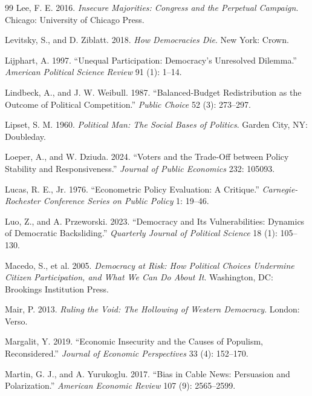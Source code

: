 \documentclass[12pt,letterpaper]{article}
\begin{document}
\begin{thebibliography}{99}
Lee, F. E. 2016. \textit{Insecure Majorities: Congress and the Perpetual Campaign}. Chicago: University of Chicago Press.

Levitsky, S., and D. Ziblatt. 2018. \textit{How Democracies Die}. New York: Crown.

Lijphart, A. 1997. ``Unequal Participation: Democracy's Unresolved Dilemma.'' \textit{American Political Science Review} 91 (1): 1--14.

Lindbeck, A., and J. W. Weibull. 1987. ``Balanced-Budget Redistribution as the Outcome of Political Competition.'' \textit{Public Choice} 52 (3): 273--297.

Lipset, S. M. 1960. \textit{Political Man: The Social Bases of Politics}. Garden City, NY: Doubleday.

Loeper, A., and W. Dziuda. 2024. ``Voters and the Trade-Off between Policy Stability and Responsiveness.'' \textit{Journal of Public Economics} 232: 105093.

Lucas, R. E., Jr. 1976. ``Econometric Policy Evaluation: A Critique.'' \textit{Carnegie-Rochester Conference Series on Public Policy} 1: 19--46.

Luo, Z., and A. Przeworski. 2023. ``Democracy and Its Vulnerabilities: Dynamics of Democratic Backsliding.'' \textit{Quarterly Journal of Political Science} 18 (1): 105--130.

Macedo, S., et al. 2005. \textit{Democracy at Risk: How Political Choices Undermine Citizen Participation, and What We Can Do About It}. Washington, DC: Brookings Institution Press.

Mair, P. 2013. \textit{Ruling the Void: The Hollowing of Western Democracy}. London: Verso.

Margalit, Y. 2019. ``Economic Insecurity and the Causes of Populism, Reconsidered.'' \textit{Journal of Economic Perspectives} 33 (4): 152--170.

Martin, G. J., and A. Yurukoglu. 2017. ``Bias in Cable News: Persuasion and Polarization.'' \textit{American Economic Review} 107 (9): 2565--2599.


\end{thebibliography}
\end{document}
